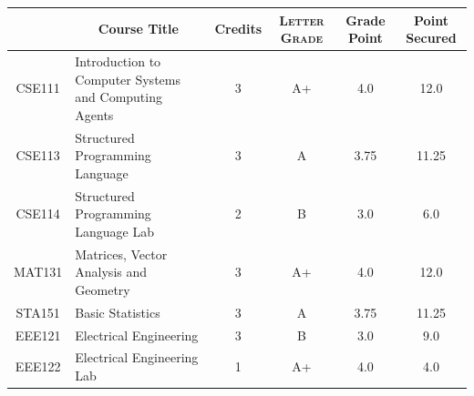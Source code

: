 \documentclass[11pt]{article}
\newcommand*{\numtwo}[1]{\pgfmathprintnumber[
                    fixed, precision=2, fixed zerofill=true]{#1}}
\begin{document}
                \begin{center}
                    \renewcommand{\arraystretch}{1.08}
                    
                \begin{tabular}{|c|l|c|>{\scshape}c|c|c|}
                \hline  \rule[-1ex]{0pt}{3.5ex} {\centering{\bf Course Code}} &  \multicolumn{1}{c|}{\textbf{Course Title}}  & {\bf Credits} & {\bf Letter Grade} & {\bf Grade Point} & {\bf Point Secured}  \\ 
                \hline   CSE111 &  Introduction to Computer Systems and Computing Agents		 & 3 & A+ & 4.0 & 12.0 \\ %
                \hline   CSE113 &  Structured Programming Language		 & 3 & A & 3.75 & 11.25 \\ %
                \hline   CSE114 &  Structured Programming Language Lab		 & 2 & B & 3.0 & 6.0 \\ %
                \hline   MAT131 &  Matrices, Vector Analysis and Geometry		 & 3 & A+ & 4.0 & 12.0 \\ %
                \hline   STA151 &  Basic Statistics		 & 3 & A & 3.75 & 11.25 \\ %
                \hline   EEE121 &  Electrical Engineering		 & 3 & B & 3.0 & 9.0 \\ %
                \hline   EEE122 &  Electrical Engineering Lab		 & 1 & A+ & 4.0 & 4.0 \\ %

\hline                %
                \end{tabular}
                \end{center}
                \renewcommand{\arraystretch}{1.03}
\end{document}
